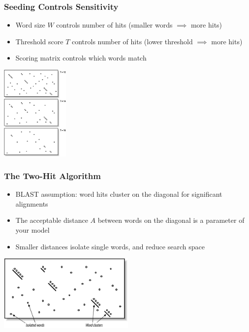 \documentclass[table]{beamer}
\begin{document}
  \begin{frame}
    \frametitle{Seeding Controls Sensitivity}
    \begin{itemize}
      \item Word size $W$ controls number of hits (smaller words $\implies$ more hits)
      \item Threshold score $T$ controls number of hits (lower threshold $\implies$ more hits)
      \item Scoring matrix controls which words match
    \end{itemize}
    \begin{center}
      \includegraphics[width=0.25\textwidth]{images/seeding_t} 
    \end{center}    
  \end{frame}

  \begin{frame}
    \frametitle{The Two-Hit Algorithm}
    \begin{itemize}
      \item BLAST assumption: word hits cluster on the diagonal for significant alignments
      \item The acceptable distance $A$ between words on the diagonal is a parameter of your model
      \item Smaller distances isolate single words, and reduce search space
    \end{itemize}
    \begin{center}
      \includegraphics[width=0.5\textwidth]{images/two_hit} 
    \end{center}    
  \end{frame}
\end{document}
